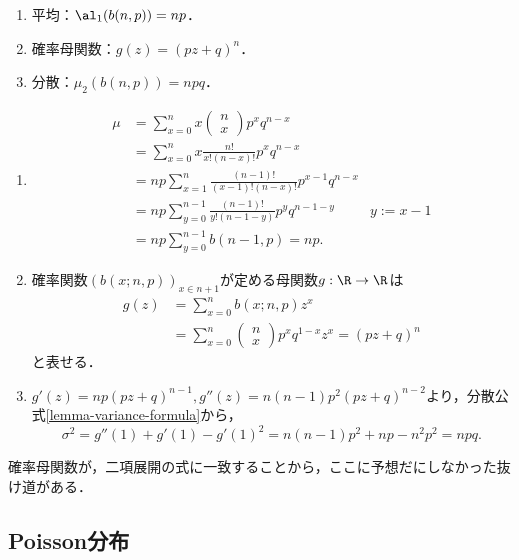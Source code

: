 \documentclass[uplatex,dvipdfmx]{jsreport}
\begin{document}
\begin{proposition}[二項分布の平均と分散]\mbox{}
    \begin{enumerate}
        \item 平均：$\al_1(b(n,p))=np$．
        \item 確率母関数：$g(z)=(pz+q)^n$．
        \item 分散：$\mu_2(b(n,p))=npq$．
    \end{enumerate}
\end{proposition}
\begin{Proof}\mbox{}
    \begin{enumerate}
        \item \begin{align*}
            \mu&=\sum^n_{x=0}x\begin{pmatrix}n\\x\end{pmatrix}p^xq^{n-x}\\
            &=\sum^n_{x=0}x\frac{n!}{x!(n-x)!}p^xq^{n-x}\\
            &=np\sum^n_{x=1}\frac{(n-1)!}{(x-1)!(n-x)!}p^{x-1}q^{n-x}\\
            &=np\sum^{n-1}_{y=0}\frac{(n-1)!}{y!(n-1-y)}p^yq^{n-1-y}&y:=x-1\\
            &=np\sum^{n-1}_{y=0}b(n-1,p)=np.
        \end{align*}
        \item 確率関数$(b(x;n,p))_{x\in n+1}$が定める母関数$g:\R\to\R$は
        \begin{align*}
            g(z)&=\sum^n_{x=0}b(x;n,p)z^x\\
            &=\sum^n_{x=0}\begin{pmatrix}n\\x\end{pmatrix}p^xq^{1-x}z^x
            =(pz+q)^n
        \end{align*}
        と表せる．
        \item $g'(z)=np(pz+q)^{n-1},g''(z)=n(n-1)p^2(pz+q)^{n-2}$より，分散公式\ref{lemma-variance-formula}から，
        \[\sigma^2=g''(1)+g'(1)-g'(1)^2=n(n-1)p^2+np-n^2p^2=npq.\]
    \end{enumerate}
\end{Proof}
\begin{remarks}
    確率母関数が，二項展開の式に一致することから，ここに予想だにしなかった抜け道がある．
\end{remarks}

\subsection{Poisson分布}
\end{document}
